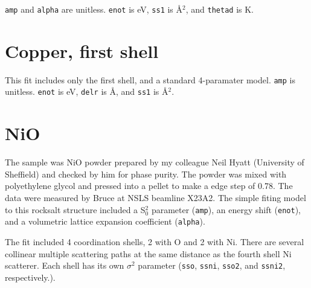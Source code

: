 \documentclass{article}
\let\stdsection\section
\renewcommand\section{\newpage\stdsection}
\begin{document}
\texttt{amp} and \texttt{alpha} are unitless.  \texttt{enot} is eV,
\texttt{ss1} is \AA$^2$, and \texttt{thetad} is K.


\renewcommand{\feffMaterial}{Copper} %
\renewcommand{\feffRone}{3}          %
\renewcommand{\feffRtwo}{4}          %
\renewcommand{\feffRthree}{5}        %
\renewcommand{\feffRfour}{5.5}       %
\renewcommand{\feffRfive}{6}         %
\renewcommand{\feffFirst}{}     %

\small

\scfsevenplots



\section{Copper, first shell}

\normalsize
This fit includes only the first shell, and a standard 4-paramater
model.  \texttt{amp} is unitless.  \texttt{enot} is eV, \texttt{delr}
is \AA, and \texttt{ss1} is \AA$^2$.

\renewcommand{\feffFirst}{_1st}

\small

\scfsevenplots





\section{NiO}

\normalsize

The sample was NiO powder prepared by my colleague Neil Hyatt
(University of Sheffield) and checked by him for phase purity.  The
powder was mixed with polyethylene glycol and pressed into a pellet to
make a edge step of 0.78.  The data were measured by Bruce at NSLS
beamline X23A2.  The simple fiting model to this rocksalt structure
included a S$_0^2$ parameter (\texttt{amp}), an energy shift
(\texttt{enot}), and a volumetric lattice expansion coefficient
(\texttt{alpha}).

The fit included 4 coordination shells, 2 with O and 2 with Ni.  There
are several collinear multiple scattering paths at the same distance
as the fourth shell Ni scatterer.  Each shell has its own $\sigma^2$
parameter (\texttt{sso}, \texttt{ssni}, \texttt{sso2}, and
\texttt{ssni2}, respectively.).
\end{document}
